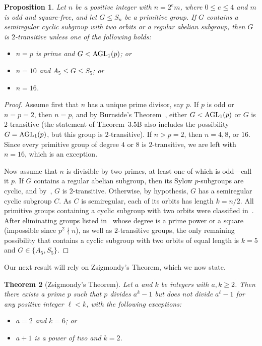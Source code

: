 \documentclass[11pt]{amsart}
\numberwithin{equation}{section}
\newtheorem{thrm}{Theorem}[section]
\newtheorem{prop}[thrm]{Proposition}
\theoremstyle{definition}
\def\AGL{{\rm AGL}}
\begin{document}
	\begin{prop}\label{170921a} 
		Let $n$ be a positive integer with $n = 2^e m$, where $0 \le e \le 4$ and $m$ is odd and square-free, and let $G \leq S_n$ be a primitive group. If $G$ contains a semiregular cyclic subgroup with two orbits or a regular abelian subgroup, then  $G$ is $2$-transitive unless one of the following holds:
		\begin{itemize}
			\item $n = p$ is prime and $G < \AGL_1(p)$; or
			\item $n = 10$ and $A_5 \leq G \leq S_5$; or
			\item $n = 16$.
		\end{itemize} 
	\end{prop}
	
	\begin{proof}
		Assume first that $n$ has a unique prime divisor, say $p$. 
		If $p$ is odd or $n = p = 2$, then $n = p$, and by Burnside’s Theorem~\cite[Theorem~3.5B]{DixonM1996}, either $G < \AGL_1(p)$ or $G$ is $2$-transitive 
		(the statement of Theorem~3.5B also includes the possibility $G = \AGL_1(p)$, but this group is $2$-transitive). 
		If $n > p = 2$, then $n = 4, 8$, or $16$. 
		Since every primitive group of degree $4$ or $8$ is $2$-transitive, we are left with $n = 16$, which is an exception.
		
		Now assume that $n$ is divisible by two primes, at least one of which is odd—call it $p$. 
		If $G$ contains a regular abelian subgroup, then its Sylow $p$-subgroups are cyclic, and by~\cite[Theorem~25.4]{Wielandt1964}, $G$ is $2$-transitive. 
		Otherwise, by hypothesis, $G$ has a semiregular cyclic subgroup $C$. 
		As $C$ is semiregular, each of its orbits has length $k = n/2$. 
		All primitive groups containing a cyclic subgroup with two orbits were classified in~\cite[Theorem~3.3]{Muller2013}. 
		After eliminating groups listed in~\cite[Theorem~3.3]{Muller2013} whose degree is a prime power or a square 
		(impossible since $p^2 \nmid n$), as well as $2$-transitive groups, 
		the only remaining possibility that contains a cyclic subgroup with two orbits of equal length is 
		$k = 5$ and $G \in \{A_5, S_5\}$.
	\end{proof}
	
	Our next result will rely on Zsigmondy’s Theorem, which we now state.
	
	\begin{thrm}[Zsigmondy’s Theorem]\label{Zsigmondythrm}
		Let $a$ and $k$ be integers with $a,k\ge 2$. Then there exists a prime $p$ such that $p$ divides $a^k - 1$ but does not divide $a^\ell - 1$ for any positive integer $\ell < k$, with the following exceptions:
		\begin{itemize}
			\item $a = 2$ and $k = 6$; or
			\item $a + 1$ is a power of two and $k = 2$.
		\end{itemize}
	\end{thrm}
	
\end{document}
